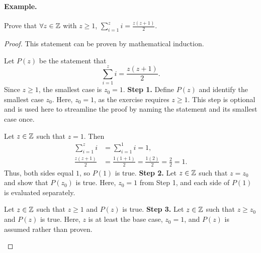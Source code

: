 \paragraph{Example.}
\begin{exercise}{
    Prove that $\forall z \in \mathbb{Z}$ with $z \ge 1$, %
    $\displaystyle\sum_{i=1}^{z} i = \frac{z(z + 1)}{2}$.
}
\end{exercise}
\begin{proof}{
    This statement can be proven by mathematical induction.

    \begin{annotatedpanel}[Setup.]{
        Let $P(z)$ be the statement that
        \[
            \sum_{i=1}^{z} i = \frac{z(z + 1)}{2}.
        \]
        Since $z \ge 1$, the smallest case is $z_0 = 1$.
    }{
        \textbf{Step 1.} Define $P(z)$ and identify the smallest case %
        $z_0$. %
        Here, $z_0 = 1$, as the exercise requires $z \ge 1$. %
        This step is optional and is used here to streamline the proof %
        by naming the statement and its smallest case once.
    }
    \end{annotatedpanel}

    \begin{annotatedpanel}{
        Let $z \in \mathbb{Z}$ such that $z = 1$. %
        Then
        \begin{align*}
            \sum_{i=1}^{z} i &= \sum_{i=1}^{1} i = 1,\\
            \frac{z(z + 1)}{2} &= \frac{1(1 + 1)}{2}
                = \frac{1(2)}{2} = \frac{2}{2} = 1.
        \end{align*}
        Thus, both sides equal $1$, so $P(1)$ is true.
    }{
        \textbf{Step 2.} Let $z \in \mathbb{Z}$ such that $z = z_0$ and show that %
        $P(z_0)$ is true. %
        Here, $z_0 = 1$ from Step 1, %
        and each side of $P(1)$ is evaluated separately.
    }
    \end{annotatedpanel}

    \begin{annotatedpanel}{
        Let $z \in \mathbb{Z}$ such that $z \ge 1$ and $P(z)$ is true.
    }{
        \textbf{Step 3.} Let $z \in \mathbb{Z}$ such that $z \ge z_0$ and $P(z)$ %
        is true. %
        Here, $z$ is at least the base case, $z_0 = 1$, and $P(z)$ is %
        assumed rather than proven.
    }
    \end{annotatedpanel}

}
\end{proof}
